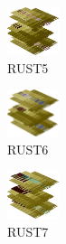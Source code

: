 \hspace{0.1cm}
\begin{minipage}[b]{0.15\linewidth}
\begin{figure}[H]                                                          
  \centering                                                             
  \begin{adjustbox}{width=1.5cm,center}                                   
  \includegraphics[width=1.5cm]{src/colorspace_colourflow/flows/colourflow_21-45.png}%
  \end{adjustbox}                                                        
\caption*{RUST5}                                           
\end{figure}                                                               
\end{minipage}
\hspace{0.1cm}
\begin{minipage}[b]{0.15\linewidth}
\begin{figure}[H]                                                          
  \centering                                                             
  \begin{adjustbox}{width=1.5cm,center}                                   
  \includegraphics[width=1.5cm]{src/colorspace_colourflow/flows/colourflow_22-45.png}%
  \end{adjustbox}                                                        
\caption*{RUST6}                                           
\end{figure}                                                               
\end{minipage}
\hspace{0.1cm}
\begin{minipage}[b]{0.15\linewidth}
\begin{figure}[H]                                                          
  \centering                                                             
  \begin{adjustbox}{width=1.5cm,center}                                   
  \includegraphics[width=1.5cm]{src/colorspace_colourflow/flows/colourflow_23-45.png}%
  \end{adjustbox}                                                        
\caption*{RUST7}                                           
\end{figure}                                                               
\end{minipage}
